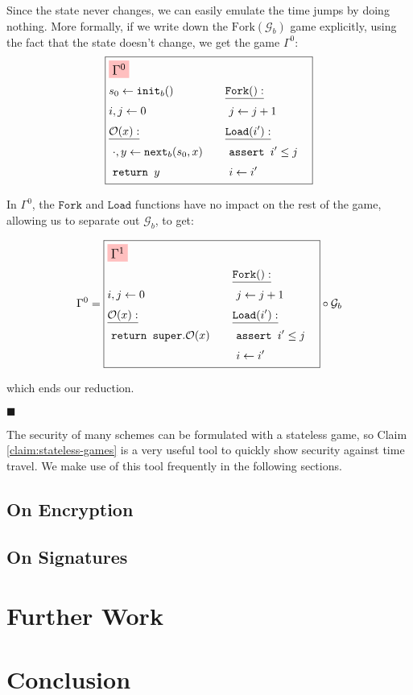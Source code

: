 Since the state never changes, we can easily emulate the time
jumps by doing nothing.
More formally, if we write down the $\text{Fork}(\mathcal{G}_b)$
game explicitly, using the fact that the state doesn't change, we get
the game $\Gamma^0$:
$$
\boxed{
\begin{aligned}
&\colorbox{pink}{\large $\Gamma^0$}\cr
&\begin{aligned}
    &s_0 \gets \texttt{init}_b()\cr
    &i, j \gets 0\cr
    &\underline{\mathcal{O}(x):}\cr
    &\ \cdot, y \gets \texttt{next}_b(s_0, x)\cr
    &\ \texttt{return } y\cr
\end{aligned}
&\begin{aligned}
    &\underline{\texttt{Fork}():}\cr
    &\ j \gets j + 1\cr
    &\underline{\texttt{Load}(i'):}\cr
    &\ \texttt{assert } i' \leq j\cr
    &\ i \gets i'\cr
\end{aligned}\cr
\end{aligned}
}
$$

In $\Gamma^0$, the $\texttt{Fork}$ and $\texttt{Load}$ functions have
no impact on the rest of the game, allowing us to separate out
$\mathcal{G}_b$, to get:

$$
\Gamma^0 = 
\boxed{
\begin{aligned}
&\colorbox{pink}{\large $\Gamma^1$}\cr
&\begin{aligned}
    &i, j \gets 0\cr
    &\underline{\mathcal{O}(x):}\cr
    &\ \texttt{return } \texttt{super}.\mathcal{O}(x)\cr
\end{aligned}
&\begin{aligned}
    &\underline{\texttt{Fork}():}\cr
    &\ j \gets j + 1\cr
    &\underline{\texttt{Load}(i'):}\cr
    &\ \texttt{assert } i' \leq j\cr
    &\ i \gets i'\cr
\end{aligned}\cr
\end{aligned}
} \circ \mathcal{G}_b
$$

which ends our reduction.

$\blacksquare$

The security of many schemes can be formulated with a stateless game,
so Claim \ref{claim:stateless-games} is a very useful tool
to quickly show security against time travel.
We make use of this tool frequently in the following sections.

\subsection{On Encryption}

\subsection{On Signatures}

\section{Further Work}

\section{Conclusion}


\small 

